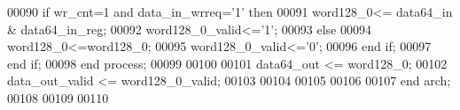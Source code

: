 \begin{DoxyCode}
00090          \textcolor{keywordflow}{if} \textcolor{vhdlchar}{wr_cnt}\textcolor{vhdlchar}{=}\textcolor{vhdllogic}{}\textcolor{vhdllogic}{1} \textcolor{keywordflow}{and} \textcolor{vhdlchar}{data_in_wrreq}\textcolor{vhdlchar}{=}\textcolor{vhdlchar}{'}\textcolor{vhdllogic}{}\textcolor{vhdllogic}{1}\textcolor{vhdlchar}{'} \textcolor{keywordflow}{then} 
00091                 \textcolor{vhdlchar}{word128_0}\textcolor{vhdlchar}{<=}  \textcolor{vhdlchar}{data64_in} \textcolor{vhdlchar}{&} \textcolor{vhdlchar}{data64_in_reg};
00092             \textcolor{vhdlchar}{word128_0_valid}\textcolor{vhdlchar}{<=}\textcolor{vhdlchar}{'}\textcolor{vhdllogic}{}\textcolor{vhdllogic}{1}\textcolor{vhdlchar}{'};
00093             \textcolor{keywordflow}{else} 
00094                 \textcolor{vhdlchar}{word128_0}\textcolor{vhdlchar}{<=}\textcolor{vhdlchar}{word128_0};
00095             \textcolor{vhdlchar}{word128_0_valid}\textcolor{vhdlchar}{<=}\textcolor{vhdlchar}{'}\textcolor{vhdllogic}{}\textcolor{vhdllogic}{0}\textcolor{vhdlchar}{'};
00096             \textcolor{keywordflow}{end} \textcolor{keywordflow}{if};
00097         \textcolor{keywordflow}{end} \textcolor{keywordflow}{if};
00098     \textcolor{keywordflow}{end} \textcolor{keywordflow}{process};
00099     
00100     
00101 \textcolor{vhdlchar}{data64_out}     \textcolor{vhdlchar}{<=} \textcolor{vhdlchar}{word128_0};
00102 \textcolor{vhdlchar}{data_out_valid} \textcolor{vhdlchar}{<=} \textcolor{vhdlchar}{word128_0_valid};
00103 
00104 
00105  
00106 
00107 \textcolor{keywordflow}{end} \textcolor{vhdlchar}{arch};   
00108 
00109 
00110 
\end{DoxyCode}
